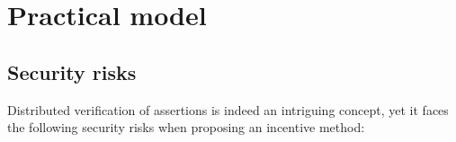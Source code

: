 \documentclass[runningheads]{llncs}
\begin{document}








\section{Practical model}
\subsection{Security risks}
Distributed verification of assertions is indeed an intriguing concept, yet it faces the following security risks when proposing an incentive method:
\end{document}
